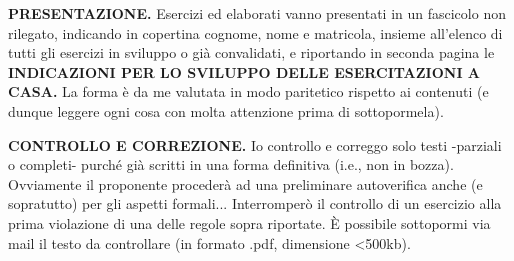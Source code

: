 \textbf{PRESENTAZIONE.} Esercizi ed elaborati vanno presentati in un fascicolo non rilegato, indicando in copertina cognome, nome e matricola, insieme all'elenco di tutti gli esercizi in sviluppo o già convalidati, e riportando in seconda pagina le \textbf{INDICAZIONI PER LO SVILUPPO DELLE ESERCITAZIONI A CASA.} La forma è da me valutata in modo paritetico rispetto ai contenuti (e dunque leggere ogni cosa con molta attenzione prima di sottopormela).

\textbf{CONTROLLO E CORREZIONE.} Io controllo e correggo solo testi -parziali o completi- purché già scritti in una forma definitiva (i.e., non in bozza). Ovviamente il proponente procederà ad una preliminare autoverifica anche (e sopratutto) per gli aspetti formali... Interromperò il controllo di un esercizio alla prima violazione di una delle regole sopra riportate. È possibile sottopormi via mail il testo da controllare (in formato .pdf, dimensione <500kb). 